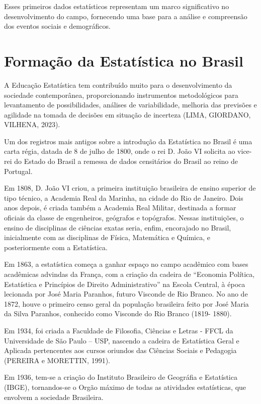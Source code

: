 \documentclass[
  letterpaper,
  DIV=11,
  numbers=noendperiod]{scrreprt}
\begin{document}
Esses primeiros dados estatísticos representam um marco significativo no
desenvolvimento do campo, fornecendo uma base para a análise e
compreensão dos eventos sociais e demográficos.

\hypertarget{formauxe7uxe3o-da-estatuxedstica-no-brasil}{%
\section{Formação da Estatística no
Brasil}\label{formauxe7uxe3o-da-estatuxedstica-no-brasil}}

A Educação Estatística tem contribuído muito para o desenvolvimento da
sociedade contemporânea, proporcionando instrumentos metodológicos para
levantamento de possibilidades, análises de variabilidade, melhoria das
previsões e agilidade na tomada de decisões em situação de incerteza
(LIMA, GIORDANO, VILHENA, 2023).

Um dos registros mais antigos sobre a introdução da Estatística no
Brasil é uma carta régia, datada de 8 de julho de 1800, onde o rei D.
João VI solicita ao vice-rei do Estado do Brasil a remessa de dados
censitários do Brasil ao reino de Portugal.

Em 1808, D. João VI criou, a primeira instituição brasileira de ensino
superior de tipo técnico, a Academia Real da Marinha, na cidade do Rio
de Janeiro. Dois anos depois, é criada também a Academia Real Militar,
destinada a formar oficiais da classe de engenheiros, geógrafos e
topógrafos. Nessas instituições, o ensino de disciplinas de ciências
exatas seria, enfim, encorajado no Brasil, inicialmente com as
disciplinas de Física, Matemática e Química, e posteriormente com a
Estatística.

Em 1863, a estatística começa a ganhar espaço no campo acadêmico com
bases acadêmicas advindas da França, com a criação da cadeira de
``Economia Política, Estatística e Princípios de Direito
Administrativo'' na Escola Central, à época lecionada por José Maria
Paranhos, futuro Visconde de Rio Branco. No ano de 1872, houve o
primeiro censo geral da população brasileira feito por José Maria da
Silva Paranhos, conhecido como Visconde do Rio Branco (1819- 1880).

Em 1934, foi criada a Faculdade de Filosofia, Ciências e Letras - FFCL
da Universidade de São Paulo -- USP, nascendo a cadeira de Estatística
Geral e Aplicada pertencentes aos cursos oriundos das Ciências Sociais e
Pedagogia (PEREIRA e MORETTIN, 1991).

Em 1936, tem-se a criação do Instituto Brasileiro de Geográfia e
Estatística (IBGE), tornandos-se o Orgão máximo de todas as atividades
estatísticas, que envolvem a sociedade Brasileira.
\end{document}
